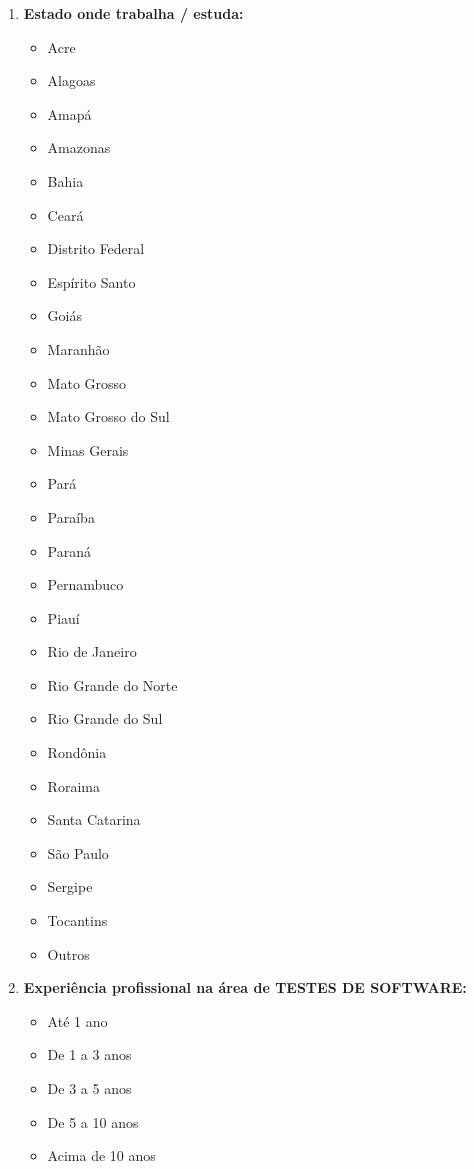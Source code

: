 \begin{enumerate}[label=\bf A\arabic*,leftmargin=1.8cm]
\begin{enumerate}[label= \arabic*]
        \item \textbf{Estado onde trabalha / estuda:}
        \begin{itemize}
            \item Acre
            \item Alagoas
            \item Amapá
            \item Amazonas
            \item Bahia
            \item Ceará
            \item Distrito Federal
            \item Espírito Santo
            \item Goiás
            \item Maranhão
            \item Mato Grosso
            \item Mato Grosso do Sul
            \item Minas Gerais
            \item Pará
            \item Paraíba
            \item Paraná
            \item Pernambuco
            \item Piauí
            \item Rio de Janeiro
            \item Rio Grande do Norte
            \item Rio Grande do Sul
            \item Rondônia
            \item Roraima
            \item Santa Catarina
            \item São Paulo
            \item Sergipe
            \item Tocantins
            \item Outros
        \end{itemize}
        
        
        \item \textbf{Experiência profissional na área de TESTES DE SOFTWARE:}
        \begin{itemize}
            \item Até 1 ano
            \item De 1 a 3 anos
            \item De 3 a 5 anos
            \item De 5 a 10 anos
            \item Acima de 10 anos
        \end{itemize}
        

\end{enumerate}
\end{enumerate}
